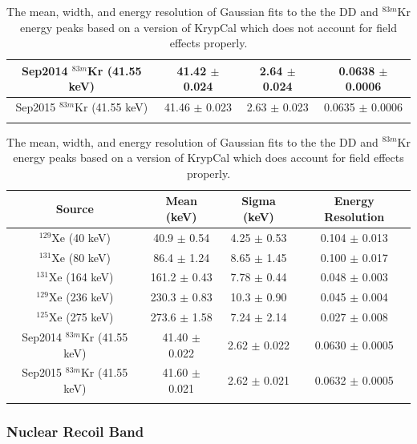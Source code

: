 \documentclass[a4paper,12pt]{article}
\begin{document}
{\begin{longtable}{|  c | c | c | c |}
Sep2014 $^{83m}$Kr (41.55 keV) & 41.42   $\pm$ 0.024 & 2.64 $\pm$ 0.024 & 0.0638  $\pm$ 0.0006  \\ \hline
  
Sep2015 $^{83m}$Kr (41.55 keV) & 41.46   $\pm$ 0.023 & 2.63  $\pm$ 0.023  & 0.0635  $\pm$ 0.0006  \\ \hline

\caption{The mean, width, and energy resolution of Gaussian fits to the the DD and $^{83m}$Kr energy peaks based on a version of KrypCal which does not account for field effects properly.}
\label{EnergyRes1}
\end{longtable}


\begin{longtable}{|  c | c | c | c |} 
\hline
Source & Mean (keV) & Sigma (keV) & Energy Resolution \\ \hline \hline
$^{129}$Xe (40 keV) & 40.9 $\pm$ 0.54  & 4.25 $\pm$ 0.53 & 0.104 $\pm$ 0.013 \\ \hline

$^{131}$Xe (80 keV) & 86.4  $\pm$ 1.24  & 8.65  $\pm$ 1.45 & 0.100  $\pm$ 0.017 \\ \hline

$^{131}$Xe (164 keV) & 161.2  $\pm$ 0.43  & 7.78  $\pm$ 0.44 & 0.048  $\pm$ 0.003  \\ \hline
 
$^{129}$Xe (236 keV) & 230.3  $\pm$ 0.83 & 10.3  $\pm$ 0.90  & 0.045  $\pm$ 0.004  \\ \hline

$^{125}$Xe (275 keV) & 273.6 $\pm$ 1.58 & 7.24   $\pm$ 2.14 & 0.027   $\pm$ 0.008  \\ \hline
 
Sep2014 $^{83m}$Kr (41.55 keV) & 41.40   $\pm$ 0.022 & 2.62 $\pm$ 0.022 & 0.0630  $\pm$ 0.0005  \\ \hline
  
Sep2015 $^{83m}$Kr (41.55 keV) & 41.60   $\pm$ 0.021 & 2.62  $\pm$ 0.021  & 0.0632  $\pm$ 0.0005  \\ \hline

\caption{The mean, width, and energy resolution of Gaussian fits to the the DD and $^{83m}$Kr energy peaks based on a version of KrypCal which does account for field effects properly.}
\label{EnergyRes2}
\end{longtable}


\subsubsection{Nuclear Recoil Band}

}
\end{document}
